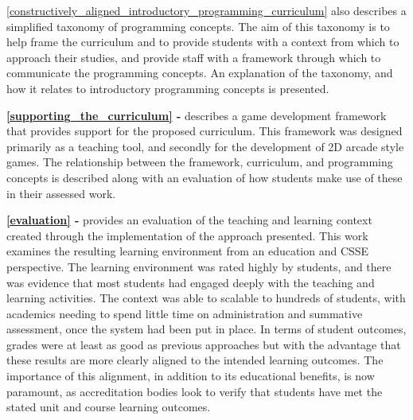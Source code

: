 \cref{constructively_aligned_introductory_programming_curriculum} also describes a simplified taxonomy of programming concepts. The aim of this taxonomy is to help frame the curriculum and to provide students with a context from which to approach their studies, and provide staff with a framework through which to communicate the programming concepts. An explanation of the taxonomy, and how it relates to introductory programming concepts is presented.

\textbf{\cref{supporting_the_curriculum} - } describes a game development framework that provides support for the proposed curriculum. This framework was designed primarily as a teaching tool, and secondly for the development of 2D arcade style games. The relationship between the framework, curriculum, and programming concepts is described along with an evaluation of how students make use of these in their assessed work.

\textbf{\cref{evaluation} - } provides an evaluation of the teaching and learning context created through the implementation of the approach presented. This work examines the resulting learning environment from an education and CSSE perspective. The learning environment was rated highly by students, and there was evidence that most students had engaged deeply with the teaching and learning activities. The context was able to scalable to hundreds of students, with academics needing to spend little time on administration and summative assessment, once the system had been put in place. In terms of student outcomes, grades were at least as good as previous approaches but with the advantage that these results are more clearly aligned to the intended learning outcomes. The importance of this alignment, in addition to its educational benefits, is now paramount, as accreditation bodies look to verify that students have met the stated unit and course learning outcomes. 


